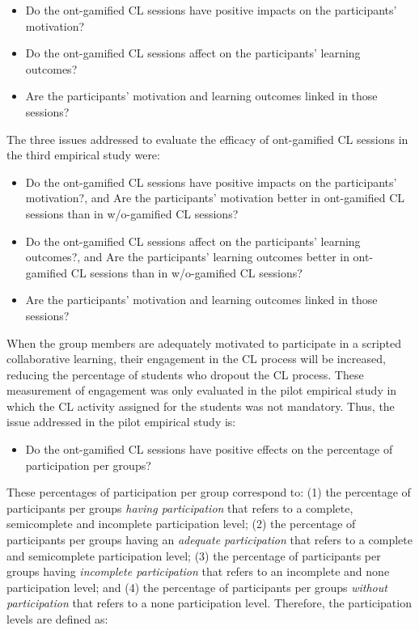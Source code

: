\begin{itemize}
\item Do the ont-gamified CL sessions have positive impacts on the participants' motivation?
\item Do the ont-gamified CL sessions affect on the participants' learning outcomes?
\item Are the participants' motivation and learning outcomes linked in those sessions?
\end{itemize}

The three issues addressed to evaluate the efficacy of ont-gamified CL sessions in the third empirical study were:

\begin{itemize}
\item Do the ont-gamified CL sessions have positive impacts on the participants' motivation?, and
Are the participants' motivation better in ont-gamified CL sessions than in w/o-gamified CL sessions?
\item Do the ont-gamified CL sessions affect on the participants' learning outcomes?, and
Are the participants' learning outcomes better in ont-gamified CL sessions than in w/o-gamified CL sessions?
\item Are the participants' motivation and learning outcomes linked in those sessions?
\end{itemize}

When the group members are adequately motivated to participate in a scripted collaborative learning, their engagement in the CL process will be increased, reducing the percentage of students who dropout the CL process.
These measurement of engagement was only evaluated in the pilot empirical study in which the CL activity assigned for the students was not mandatory. 
Thus, the issue addressed in the pilot empirical study is:

\begin{itemize}
\item Do the ont-gamified CL sessions have positive effects on the percentage of participation per groups?
\end{itemize}

These percentages of participation per group correspond to:
(1) the percentage of participants per groups \emph{having participation} that refers to a complete, semicomplete and incomplete participation level;
(2) the percentage of participants per groups having an \emph{adequate participation} that refers to a complete and semicomplete participation level;
(3) the percentage of participants per groups having \emph{incomplete participation} that refers to an incomplete and none participation level; and
(4) the percentage of participants per groups \emph{without participation} that refers to a none participation level.
Therefore, the participation levels are defined as:

